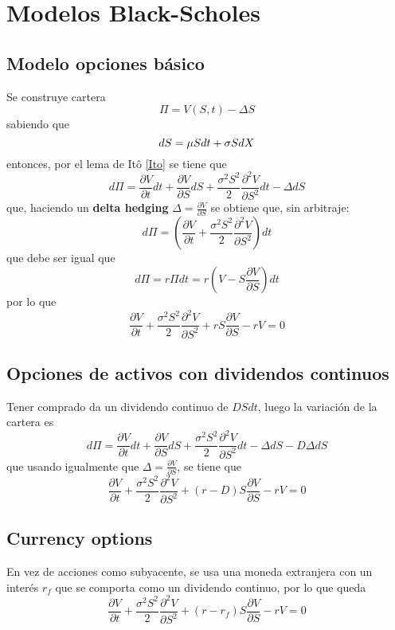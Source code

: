 
\section{Modelos Black-Scholes}




\subsection{Modelo opciones básico}
Se construye cartera
$$\Pi = V(S,t) - \Delta S$$
sabiendo que
$$dS = \mu Sdt + \sigma S d\mathnormal{X}$$  
entonces, por el lema de Itô \ref{Ito} se tiene que
$$d\Pi = \frac{\partial V}{\partial t}dt + \frac{\partial V}{\partial S}dS + \frac{\sigma^2S^2}{2} \frac{\partial^2 V}{\partial S^2}dt - \Delta dS$$
que, haciendo un \textbf{delta hedging} $\Delta = \frac{\partial V}{\partial S}$ se obtiene que, sin arbitraje:
$$d\Pi = \left( \frac{\partial V}{\partial t} + \frac{\sigma^2S^2}{2} \frac{\partial^2 V}{\partial S^2} \right)dt$$
que debe ser igual que
$$d\Pi = r\Pi dt = r\left( V - S \frac{\partial V}{\partial S} \right)dt$$
por lo que
$$\boxed{\frac{\partial V}{\partial t} + \frac{\sigma^2S^2}{2} \frac{\partial^2 V}{\partial S^2} + rS \frac{\partial V}{\partial S} -rV = 0} $$



\subsection{Opciones de activos con dividendos continuos}
Tener comprado da un dividendo continuo de $DSdt$, luego la variación de la cartera es
$$d\Pi = \frac{\partial V}{\partial t}dt + \frac{\partial V}{\partial S}dS + \frac{\sigma^2S^2}{2} \frac{\partial^2 V}{\partial S^2}dt - \Delta dS - D\Delta dS$$
que usando igualmente que $\Delta = \frac{\partial V}{\partial S}$, se tiene que
$$\boxed{\frac{\partial V}{\partial t} + \frac{\sigma^2S^2}{2} \frac{\partial^2 V}{\partial S^2} + (r-D)S \frac{\partial V}{\partial S} -rV = 0}$$



\subsection{Currency options}
En vez de acciones como subyacente, se usa una moneda extranjera con un interés $r_f$ que se comporta como un dividendo continuo, por lo que queda
$$\boxed{\frac{\partial V}{\partial t} + \frac{\sigma^2S^2}{2} \frac{\partial^2 V}{\partial S^2} + (r-r_f)S \frac{\partial V}{\partial S} -rV = 0}$$




